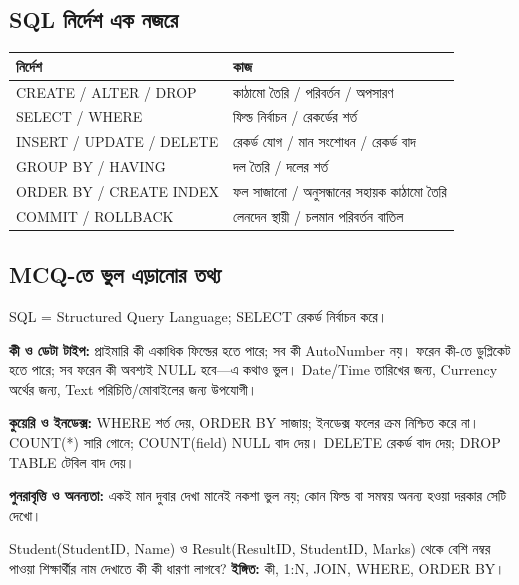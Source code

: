 \begin{minipage}[t]{.51\linewidth}\vspace{0pt}\small
\subsection{SQL নির্দেশ এক নজরে}
\begin{tabularx}{\linewidth}{|p{27mm}|X|}\hline
নির্দেশ & কাজ\\ \hline
CREATE / ALTER / DROP & কাঠামো তৈরি / পরিবর্তন / অপসারণ\\ \hline
SELECT / WHERE & ফিল্ড নির্বাচন / রেকর্ডের শর্ত\\ \hline
INSERT / UPDATE / DELETE & রেকর্ড যোগ / মান সংশোধন / রেকর্ড বাদ\\ \hline
GROUP BY / HAVING & দল তৈরি / দলের শর্ত\\ \hline
ORDER BY / CREATE INDEX & ফল সাজানো / অনুসন্ধানের সহায়ক কাঠামো তৈরি\\ \hline
COMMIT / ROLLBACK & লেনদেন স্থায়ী / চলমান পরিবর্তন বাতিল\\ \hline
\end{tabularx}
\end{minipage}\par\smallskip

\subsection{MCQ-তে ভুল এড়ানোর তথ্য}
SQL = Structured Query Language; SELECT রেকর্ড নির্বাচন করে।

\textbf{কী ও ডেটা টাইপ:} প্রাইমারি কী একাধিক ফিল্ডের হতে পারে; সব কী AutoNumber নয়। ফরেন কী-তে ডুপ্লিকেট হতে পারে; সব ফরেন কী অবশ্যই NULL হবে—এ কথাও ভুল। Date/Time তারিখের জন্য, Currency অর্থের জন্য, Text পরিচিতি/মোবাইলের জন্য উপযোগী।

\textbf{কুয়েরি ও ইনডেক্স:} WHERE শর্ত দেয়, ORDER BY সাজায়; ইনডেক্স ফলের ক্রম নিশ্চিত করে না। COUNT(*) সারি গোনে; COUNT(field) NULL বাদ দেয়। DELETE রেকর্ড বাদ দেয়; DROP TABLE টেবিল বাদ দেয়।

\textbf{পুনরাবৃত্তি ও অনন্যতা:} একই মান দুবার দেখা মানেই নকশা ভুল নয়; কোন ফিল্ড বা সমন্বয় অনন্য হওয়া দরকার সেটি দেখো।

Student(StudentID, Name) ও Result(ResultID, StudentID, Marks) থেকে বেশি নম্বর পাওয়া শিক্ষার্থীর নাম দেখাতে কী কী ধারণা লাগবে? \textbf{ইঙ্গিত:} কী, 1:N, JOIN, WHERE, ORDER BY।
